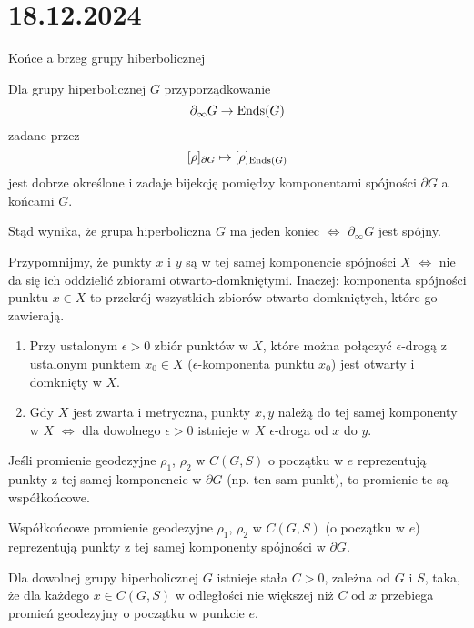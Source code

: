 \section{18.12.2024}{Końce a brzeg grupy hiberbolicznej}

\begin{theorem}{}{}
  Dla grupy hiperbolicznej $G$ przyporządkowanie 
  $$\partial_\infty G\to \operatorname{Ends}(G)$$
  zadane przez 
  $$[\rho]_{\partial G}\mapsto [\rho]_{\operatorname{Ends}(G)}$$
  jest dobrze określone i zadaje bijekcję pomiędzy komponentami spójności $\partial G$ a końcami $G$.
\end{theorem}

Stąd wynika, że grupa hiperboliczna $G$ ma jeden koniec $\iff$ $\partial_\infty G$ jest spójny.

Przypomnijmy, że punkty $x$ i $y$ są w tej samej komponencie spójności $X$ $\iff$ nie da się ich oddzielić zbiorami otwarto-domkniętymi. Inaczej: komponenta spójności punktu $x\in X$ to przekrój wszystkich zbiorów otwarto-domkniętych, które go zawierają.

\begin{enumerate}
  \item Przy ustalonym $\epsilon>0$ zbiór punktów w $X$, które można połączyć $\epsilon$-drogą z ustalonym punktem $x_0\in X$ ($\epsilon$-komponenta punktu $x_0$) jest otwarty i domknięty w $X$. 
  \item Gdy $X$ jest zwarta i metryczna, punkty $x,y$ należą do tej samej komponenty w $X$ $\iff$ dla dowolnego $\epsilon>0$ istnieje w $X$ $\epsilon$-droga od $x$ do $y$.
\end{enumerate}

\begin{fact}{}{}
  Jeśli promienie geodezyjne $\rho_1$, $\rho_2$ w $C(G,S)$ o początku w $e$ reprezentują punkty z tej samej komponencie w $\partial G$ (np. ten sam punkt), to promienie te są współkońcowe.
\end{fact}

\begin{fact}{}{}
  Współkońcowe promienie geodezyjne $\rho_1$, $\rho_2$ w $C(G,S)$ (o początku w $e$) reprezentują punkty z tej samej komponenty spójności w $\partial G$.
\end{fact}

Dla dowolnej grupy hiperbolicznej $G$ istnieje stała $C>0$, zależna od $G$ i $S$, taka, że dla każdego $x\in C(G,S)$ w odległości nie większej niż $C$ od $x$ przebiega promień geodezyjny o początku w punkcie $e$.











